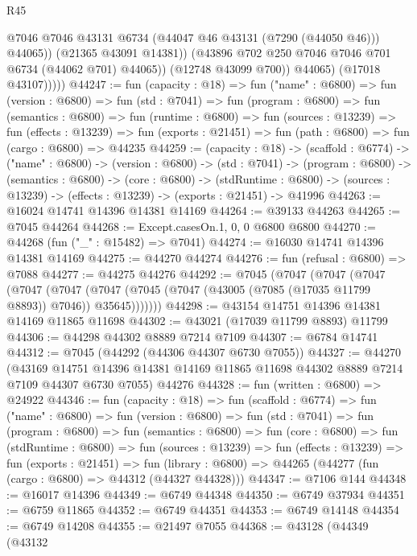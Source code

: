 \begin{lexlean}{R45}
\begin{coremodule}
{                        @7046
                        @7046
                        @43131
                        @6734
                        (@44047 @46 @43131 (@7290 (@44050 @46)))
                        @44065))
                    (@21365 @43091 @14381))
                  (@43896 @702 @250 @7046 @7046 @701 @6734 (@44062 @701) @44065))
                (@12748 @43099 @700))
              @44065)
            (@17018 @43107)))))
@44247 := fun (capacity : @18) =>
  fun ("name" : @6800) =>
  fun (version : @6800) =>
  fun (std : @7041) =>
  fun (program : @6800) =>
  fun (semantics : @6800) =>
  fun (runtime : @6800) =>
  fun (sources : @13239) =>
  fun (effects : @13239) =>
  fun (exports : @21451) => fun (path : @6800) => fun (cargo : @6800) => @44235
@44259 := (capacity : @18) ->
  (scaffold : @6774) ->
  ("name" : @6800) ->
  (version : @6800) ->
  (std : @7041) ->
  (program : @6800) ->
  (semantics : @6800) ->
  (core : @6800) ->
  (stdRuntime : @6800) -> (sources : @13239) -> (effects : @13239) -> (exports : @21451) -> @41996
@44263 := @16024 @14741 @14396 @14381 @14169
@44264 := @39133 @44263
@44265 := @7045 @44264
@44268 := Except.casesOn.{1, 0, 0} @6800 @6800
@44270 := @44268 (fun ("_" : @15482) => @7041)
@44274 := @16030 @14741 @14396 @14381 @14169
@44275 := @44270 @44274
@44276 := fun (refusal : @6800) => @7088
@44277 := @44275 @44276
@44292 := @7045
    (@7047
      (@7047
        (@7047
          (@7047
            (@7047 (@7047 (@7045 (@7047 (@43005 (@7085 (@17035 @11799 @8893)) @7046)) @35645)))))))
@44298 := @43154 @14751 @14396 @14381 @14169 @11865 @11698
@44302 := @43021 (@17039 @11799 @8893) @11799
@44306 := @44298 @44302 @8889 @7214 @7109
@44307 := @6784 @14741
@44312 := @7045 (@44292 (@44306 @44307 @6730 @7055))
@44327 := @44270
    (@43169 @14751 @14396 @14381 @14169 @11865 @11698 @44302 @8889 @7214 @7109 @44307 @6730 @7055)
    @44276
@44328 := fun (written : @6800) => @24922
@44346 := fun (capacity : @18) =>
  fun (scaffold : @6774) =>
  fun ("name" : @6800) =>
  fun (version : @6800) =>
  fun (std : @7041) =>
  fun (program : @6800) =>
  fun (semantics : @6800) =>
  fun (core : @6800) =>
  fun (stdRuntime : @6800) =>
  fun (sources : @13239) =>
  fun (effects : @13239) =>
  fun (exports : @21451) =>
  fun (library : @6800) => @44265 (@44277 (fun (cargo : @6800) => @44312 (@44327 @44328)))
@44347 := @7106 @144
@44348 := @16017 @14396
@44349 := @6749 @44348
@44350 := @6749 @37934
@44351 := @6759 @11865
@44352 := @6749 @44351
@44353 := @6749 @14148
@44354 := @6749 @14208
@44355 := @21497 @7055
@44368 := @43128
    (@44349
      (@43132
}
\end{coremodule}
\end{lexlean}
